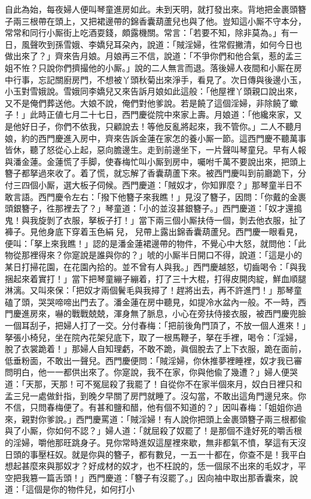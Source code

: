 自此為始，每夜婦人便叫琴童進房如此。未到天明，就打發出來。背地把金裹頭簪子兩三根帶在頭上，又把裙邊帶的錦香囊葫蘆兒也與了他。豈知這小厮不守本分，常常和同行小厮街上吃酒耍錢，頗露機關。常言：「若要不知，除非莫為。」有一日，風聲吹到孫雪娥、李嬌兒耳朶內，說道：「賊淫婦，徃常假撇清，如何今日也做出來了？」齊來告月娘。月娘再三不信，{}說道：「不爭你們和他合氣，惹的孟三姐不恠？只說你們擠撮他的小厮。」說的二人無言而退。落後婦人夜間和小厮在房中行事，忘記關廚房門，不想被丫頭秋菊出來淨手，看見了。次日傳與後邊小玉，小玉對雪娥說。雪娥同李嬌兒又來告訴月娘如此這般：「他屋裡丫頭親口說出來，又不是俺們葬送他。大娘不說，俺們對他爹說。若是饒了這個淫婦，非除饒了蠍子！」此時正値七月二十七日，西門慶從院中來家上壽。月娘道：「他纔來家，又是他好日子，你們不依我，只顧說去！等他反亂將起來，我不管你。」二人不聽月娘，約的西門慶進入房中，齊來告訴金蓮在家怎的養小厮一節。這西門慶不聽萬事皆休，聽了怒從心上起，惡向膽邊生。走到前邊坐下，一片聲叫琴童兒。早有人報與潘金蓮。金蓮慌了手脚，使春梅忙叫小厮到房中，囑咐千萬不要說出來，把頭上簪子都拏過來收了。着了慌，就忘解了香囊葫蘆下來。{}被西門慶叫到前廳跪下，分付三四個小厮，選大板子伺候。西門慶道：「賊奴才，你知罪麼？」那琴童半日不敢言語。西門慶令左右：「撥下他簪子來我瞧！」見沒了簪子，因問：「你戴的金裹頭銀簪子，徃那裡去了？」琴童道：「小的並沒甚銀簪子。」西門慶道：「奴才還搗鬼！與我旋剝了衣服，拏板子打！」當下兩三個小厮扶侍一個，剝去他衣服，扯了褲子。見他身底下穿着玉色絹𧜽兒，𧜽兒帶上露出錦香囊葫蘆兒。西門慶一眼看見，便叫：「拏上來我瞧！」認的是潘金蓮裙邊帶的物件，{}不覺心中大怒，就問他：「此物從那裡得來？你寔說是誰與你的？」唬的小厮半日開口不得，說道：「這是小的某日打掃花園，在花園內拾的。並不曾有人與我。」西門慶越怒，切齒喝令：「與我捆起來着實打！」當下把琴童繃子繃着，打了三十大棍，打得皮開肉綻，鮮血順腿淋漓。又叫來保：「把奴才兩個鬢毛與我撏了！趕將出去，再不許進門！」{}那琴童磕了頭，哭哭啼啼出門去了。潘金蓮在房中聽見，如提冷水盆內一般。不一時，西門慶進房來，嚇的戰戰兢兢，渾身無了脈息，小心在旁扶侍接衣服，被西門慶兜臉一個耳刮子，把婦人打了一交。分付春梅：「把前後角門頂了，不放一個人進來！」拏張小椅兒，坐在院內花架兒底下，取了一根馬鞭子，拏在手裡，喝令：「淫婦，脫了衣裳跪着！」那婦人自知理虧，不敢不跪，眞個脫去了上下衣服，跪在面前，低垂粉面，不敢出一聲兒。{}西門慶便問：「賊淫婦，你休推夢裡睡裡，奴才我已審問明白，他一一都供出來了。你寔說，我不在家，你與他偸了幾遭？」婦人便哭道：「天那，天那！可不冤屈殺了我罷了！自從你不在家半個來月，奴白日裡只和孟三兒一處做針指，到晚夕早關了房門就睡了。沒勾當，不敢出這角門邊兒來。你不信，只問春梅便了。{}有甚和鹽和醋，他有個不知道的？」因叫春梅：「姐姐你過來，親對你爹說。」西門慶罵道：「賊淫婦！有人說你把頭上金裹頭簪子兩三根都偸與了小厮，你如何不認？」{}婦人道：「就屈殺了奴罷了！是那個不逢好死的嚼舌根的淫婦，嚼他那旺跳身子。見你常時進奴這屋裡來歇，無非都氣不憤，拏這有天沒日頭的事壓枉奴。就是你與的簪子，都有數兒，一五一十都在，你查不是！我平白想起甚麼來與那奴才？好成材的奴才，也不枉說的，恁一個尿不出來的毛奴才，{}平空把我篡一篇舌頭！」西門慶道：「簪子有沒罷了。」因向袖中取出那香囊來，說道：「這個是你的物件兒，如何打小